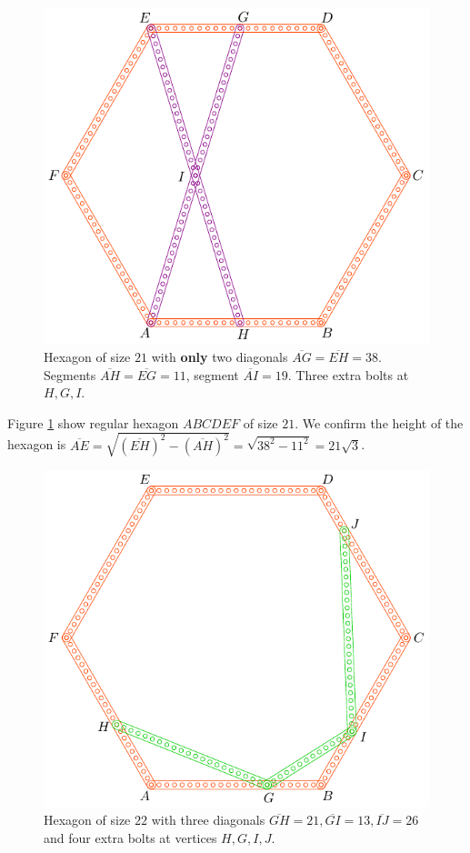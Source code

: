 \documentclass[11pt]{article}
\begin{document}
\begin{figure}[H]
\centering
\includegraphics[scale=1]{21/hexa-21a}
\caption{Hexagon of size $21$ with \textbf{only} two diagonals $\overline{AG} = \overline{EH} = 38$. Segments $\overline{AH} = \overline{EG} = 11$, segment $\overline{AI} = 19$. Three extra bolts at $H,G,I$.}
\label{fig:21a}
\end{figure}

Figure \ref{fig:21a} show regular hexagon $ABCDEF$ of size $21$. We confirm the height of the hexagon is $\overline{AE} = \sqrt{(\overline{EH})^2 - (\overline{AH})^2} = \sqrt{38^2 - 11^2} = 21\sqrt3$.

\begin{figure}[H]
\centering
\includegraphics[scale=0.9]{22/hexa-22a}
\caption{Hexagon of size $22$ with three diagonals $\overline{GH} = 21, \overline{GI} = 13, \overline{IJ} = 26$ and four extra bolts at vertices $H,G,I,J$.}
\label{fig:22a}
\end{figure}
\end{document}
